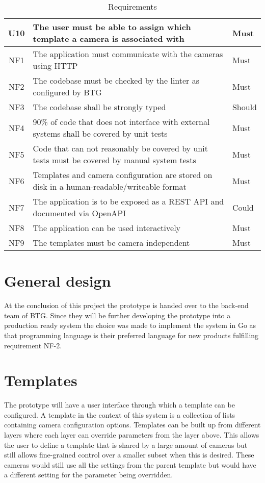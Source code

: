 \begin{table*}[h]
\begin{tabulary}{\linewidth}{CLL}
		\\ \hline
		U10 & The user must be able to assign which template a camera is associated with & Must
        \\ \hline
        NF1 & The application must communicate with the cameras using HTTP & Must
        \\ \hline
        NF2 & The codebase must be checked by the linter as configured by BTG & Must
        \\ \hline
        NF3 & The codebase shall be strongly typed & Should
        \\ \hline
        NF4 & 90\% of code that does not interface with external systems shall be covered by unit tests& Must
		\\ \hline
		NF5 & Code that can not reasonably be covered by unit tests must be covered by manual system tests & Must
        \\ \hline
        NF6 & Templates and camera configuration are stored on disk in a human-readable/writeable format & Must
        \\ \hline
        NF7 & The application is to be exposed as a REST API and documented via OpenAPI & Could
		\\ \hline
		NF8 & The application can be used interactively & Must
        \\ \hline
        NF9 & The templates must be camera independent & Must
    \end{tabulary}
    \caption{Requirements}
    \label{tab:requirements}
\end{table*}

\section{General design}
At the conclusion of this project the prototype is handed over to the back-end team of BTG.
Since they will be further developing the prototype into a production ready system the choice was made to implement the system in Go as that programming language is their preferred language for new products fulfilling requirement NF-2.

\section{Templates}
The prototype will have a user interface through which a template can be configured.
A template in the context of this system is a collection of lists containing camera configuration options.
Templates can be built up from different layers where each layer can override parameters from the layer above.
This allows the user to define a template that is shared by a large amount of cameras but still allows fine-grained control over a smaller subset when this is desired.
These cameras would still use all the settings from the parent template but would have a different setting for the parameter being overridden.


